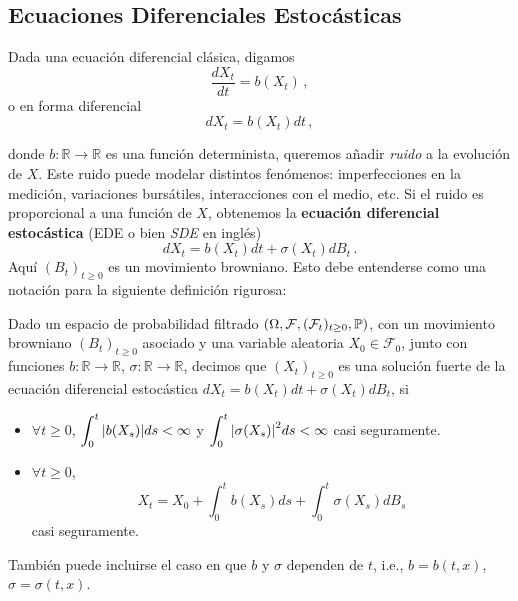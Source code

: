 \subsection{Ecuaciones Diferenciales Estocásticas}
Dada una ecuación diferencial clásica, digamos 
\begin{equation*}
        \frac{dX_t}{dt} = b(X_t)\,,
\end{equation*}
o en forma diferencial 
\begin{equation*}
        dX_t = b(X_t) dt\,,
\end{equation*}

donde $b: \mathbb{R} \to \mathbb{R}$ es una función determinista, queremos añadir \textit{ruido} a la evolución 
de $X$. Este ruido puede modelar distintos fenómenos: imperfecciones en la medición, variaciones 
bursátiles, interacciones con el medio, etc. Si el ruido es proporcional a una función de $X$, obtenemos 
la \textbf{ecuación diferencial estocástica} (EDE o bien \textit{SDE} en inglés)
\begin{equation*}
        \label{eq:sde_1}
        dX_t = b(X_t) dt + \sigma (X_t) dB_t \,.
\end{equation*}
Aquí $(B_t)_{t \ge  0}$ es un movimiento browniano. Esto debe entenderse como una notación para 
la siguiente definición rigurosa:
\begin{definition}
\label{def:sol_ede}
Dado un espacio de probabilidad filtrado $(\Omega, \mathcal{F},(\mathcal{F}_t)_{t \geq 0}, \P)$, con un movimiento browniano $(B_t)_{t \ge 0}$ asociado y una variable aleatoria $X_0 \in \mathcal{F}_0$, junto con funciones $b: \mathbb{R} \to \mathbb{R}$, $\sigma: \mathbb{R} \to \mathbb{R}$, decimos que $(X_t)_{t \ge 0}$ es una solución fuerte de la ecuación diferencial estocástica $dX_t = b(X_t) dt + \sigma (X_t) dB_t$, si 
\begin{itemize}
\item $\displaystyle \forall  t \ge  0$, $\displaystyle\int_{0}^{t} \abs{b(X_s)} ds < \infty$ y 
     $\displaystyle\int_{0}^{t} \abs{\sigma (X_s)}^2 ds < \infty$ casi seguramente.
\item $\forall  t \ge 0$,
\begin{equation*}
     \label{eq:sde_2}
     X_t = X_0 + \int_{0}^{t} b(X_s) ds  + \int_{0}^{t} \sigma (X_s) dB_s 
\end{equation*}
casi seguramente. 
\end{itemize}
\end{definition}
\begin{remark}
    También puede incluirse el caso en que $b$ y $\sigma$ dependen de $t$, i.e., $b = b(t,x)$, $\sigma = \sigma(t,x)$. 
\end{remark}


